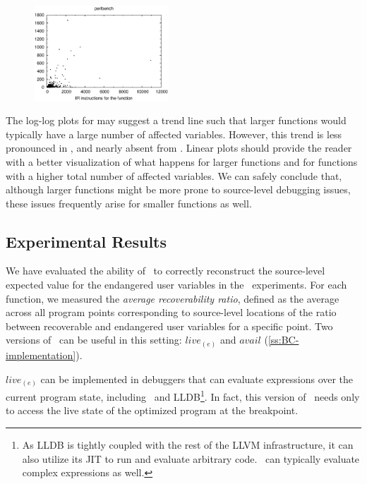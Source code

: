\begin{figure}[!t]
\begin{center}
{\includegraphics[width=0.45\textwidth]{figures/CS-debug-tot-dead/tot-dead-perlbench-linear.eps}
}
\caption{\protect}
\end{center}
\end{figure}

The log-log plots for  may suggest a trend line such that larger functions would typically have a large number of affected variables. However, this trend is less pronounced in , and nearly absent from . Linear plots should provide the reader with a better visualization of what happens for larger functions and for functions with a higher total number of affected variables. We can safely conclude that, although larger functions might be more prone to source-level debugging issues, these issues frequently arise for smaller functions as well.

\subsection{Experimental Results}
We have evaluated the ability of \buildcomp\ to correctly reconstruct the source-level expected value for the endangered user variables in the \speccpu\ experiments. For each function, we measured the {\em average recoverability ratio}, defined as the average across all program points corresponding to source-level locations of the ratio between recoverable and endangered user variables for a specific point. Two versions of \reconstruct\ can be useful in this setting: $live_{(e)}$ and $avail$ (\mysection\ref{ss:BC-implementation}).

$live_{(e)}$ can be implemented in debuggers that can evaluate expressions over the current program state, including \gdb\ and LLDB\footnote{As LLDB is tightly coupled with the rest of the LLVM infrastructure, it can also utilize its JIT to run and evaluate arbitrary code. \gdb\ can typically evaluate complex expressions as well.}. In fact, this version of \reconstruct\ needs only to access the live state of the optimized program at the breakpoint.

